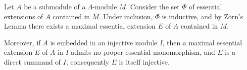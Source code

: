Let $A$ be a submodule of a $\Lambda$-module $M$. Consider the set $\Phi$ of essential extensions of $A$ contained in $M$. Under inclusion, $\Phi$ is inductive, and by Zorn's Lemma there exists a maximal essential extension $E$ of $A$ contained in $M$.

Moreover, if $A$ is embedded in an injective module $I$, then a maximal essential extension $E$ of $A$ in $I$ admits no proper essential monomorphism, and $E$ is a direct summand of $I$; consequently $E$ is itself injective.
